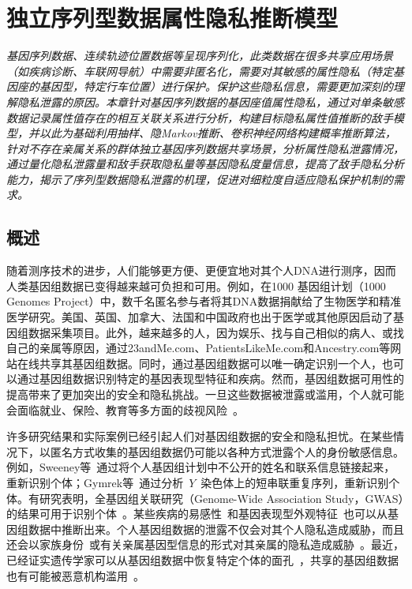 \chapter{独立序列型数据属性隐私推断模型}
\label{chap:inference-attack-on-norelated-sequenced-data}

\textit{ }

\textit{基因序列数据、连续轨迹位置数据等呈现序列化，此类数据在很多共享应用场景（如疾病诊断、车联网导航）中需要非匿名化，需要对其敏感的属性隐私（特定基因座的基因型，特定行车位置）进行保护。保护这些隐私信息，需要更加深刻的理解隐私泄露的原因。本章针对基因序列数据的基因座值属性隐私，通过对单条敏感数据记录属性值存在的相互关联关系进行分析，构建目标隐私属性值推断的敌手模型，并以此为基础利用抽样、隐Markov推断、卷积神经网络构建概率推断算法，针对不存在亲属关系的群体独立基因序列数据共享场景，分析属性隐私泄露情况，通过量化隐私泄露量和敌手获取隐私量等基因隐私度量信息，提高了敌手隐私分析能力，揭示了序列型数据隐私泄露的机理，促进对细粒度自适应隐私保护机制的需求。
}

\section{概述}\label{sec:intro}

随着测序技术的进步，人们能够更方便、更便宜地对其个人DNA进行测序，因而人类基因组数据已变得越来越可负担和可用。例如，在1000 基因组计划（1000 Genomes Project）\cite{gpc2015global}中，数千名匿名参与者将其DNA数据捐献给了生物医学和精准医学研究。美国、英国、加拿大、法国和中国政府也出于医学或其他原因启动了基因组数据采集项目。此外，越来越多的人，因为娱乐、找与自己相似的病人、或找自己的亲属等原因，通过23andMe.com、PatientsLikeMe.com和Ancestry.com等网站在线共享其基因组数据。同时，通过基因组数据可以唯一确定识别一个人，也可以通过基因组数据识别特定的基因表现型特征和疾病。然而，基因组数据可用性的提高带来了更加突出的安全和隐私挑战。一旦这些数据被泄露或滥用，个人就可能会面临就业、保险、教育等多方面的歧视风险~\cite{eeoc2008genetic}。

许多研究结果和实际案例已经引起人们对基因组数据的安全和隐私担忧。在某些情况下，以匿名方式收集的基因组数据仍可能以各种方式泄露个人的身份敏感信息。例如，Sweeney等~\cite{sweeney2013identifying}通过将个人基因组计划中不公开的姓名和联系信息链接起来，重新识别个体；Gymrek等~\cite{gymrek2013identifying}通过分析~$Y$~染色体上的短串联重复序列，重新识别个体。有研究表明，全基因组关联研究（Genome-Wide Association Study，GWAS）的结果可用于识别个体~\cite{cai2015deterministic}。某些疾病的易感性~\cite{shringarpure2015privacy}和基因表现型外观特征~\cite{walsh2011irisplex}也可以从基因组数据中推断出来。个人基因组数据的泄露不仅会对其个人隐私造成威胁，而且还会以家族身份~\cite{rohlfs2012familial}或有关亲属基因型信息的形式对其亲属的隐私造成威胁~\cite{humbert2013addressing}。最近，已经证实遗传学家可以从基因组数据中恢复特定个体的面孔~\cite{hess2017controversial}，共享的基因组数据也有可能被恶意机构滥用~\cite{scutti2018what}。

